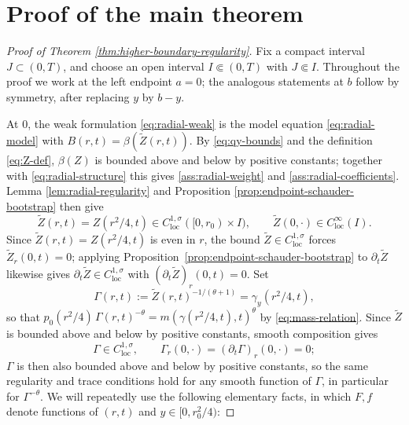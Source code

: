 \documentclass[11pt]{amsart}
\newcommand{\loc}{\mathrm{loc}}
\begin{document}
\section{Proof of the main theorem}
\label{sec:proof-main-theorem}

\begin{proof}[Proof of Theorem \ref{thm:higher-boundary-regularity}]
Fix a compact interval \(J\subset(0,T)\), and choose an open
interval \(I\Subset(0,T)\) with \(J\Subset I\). Throughout the proof we work
at the left endpoint \(a=0\); the analogous statements at \(b\) follow by
symmetry, after replacing \(y\) by \(b-y\).

At \(0\), the weak formulation \eqref{eq:radial-weak} is the model
equation \eqref{eq:radial-model} with \(B(r,t)=\beta(\widetilde Z(r,t))\). By
\eqref{eq:qy-bounds} and the definition \eqref{eq:Z-def}, \(\beta(Z)\) is
bounded above and below by positive constants; together with
\eqref{eq:radial-structure} this gives \eqref{ass:radial-weight} and
\eqref{ass:radial-coefficients}. Lemma \ref{lem:radial-regularity} and
Proposition \ref{prop:endpoint-schauder-bootstrap} then give
\[
        \widetilde Z(r,t)=Z(r^2/4,t)\in C^{1,\sigma}_{\loc}([0,r_0)\times I),
        \qquad
        \widetilde Z(0,\cdot)\in C^\infty_{\loc}(I).
\]
Since \(\widetilde Z(r,t)=Z(r^2/4,t)\) is even in \(r\), the bound
\(\widetilde Z\in C^{1,\sigma}_{\loc}\) forces \(\widetilde Z_r(0,t)=0\); applying
Proposition~\ref{prop:endpoint-schauder-bootstrap} to \(\partial_t\widetilde Z\)
likewise gives \(\partial_t\widetilde Z\in C^{1,\sigma}_{\loc}\) with
\((\partial_t\widetilde Z)_r(0,t)=0\). Set
\begin{equation}
\label{eq:Gamma-def}
        \Gamma(r,t):=\widetilde Z(r,t)^{-1/(\theta+1)}=\gamma_y(r^2/4,t),
\end{equation}
so that
\(p_0(r^2/4)\,\Gamma(r,t)^{-\theta}=m(\gamma(r^2/4,t),t)^\theta\) by
\eqref{eq:mass-relation}. Since \(\widetilde Z\) is bounded above and below by
positive constants, smooth composition gives
\begin{equation}
\label{eq:Gamma-regularity}
        \Gamma\in C^{1,\sigma}_{\loc},\qquad
        \Gamma_r(0,\cdot)=(\partial_t\Gamma)_r(0,\cdot)=0;
\end{equation}
\(\Gamma\) is then also bounded above and below by positive constants,
so the same regularity and trace conditions hold for any smooth
function of \(\Gamma\), in particular for \(\Gamma^{-\theta}\). We will repeatedly use the following elementary facts,
in which \(F,f\) denote functions of \((r,t)\) and \(y\in[0,r_0^2/4)\):

\end{proof}
\end{document}
